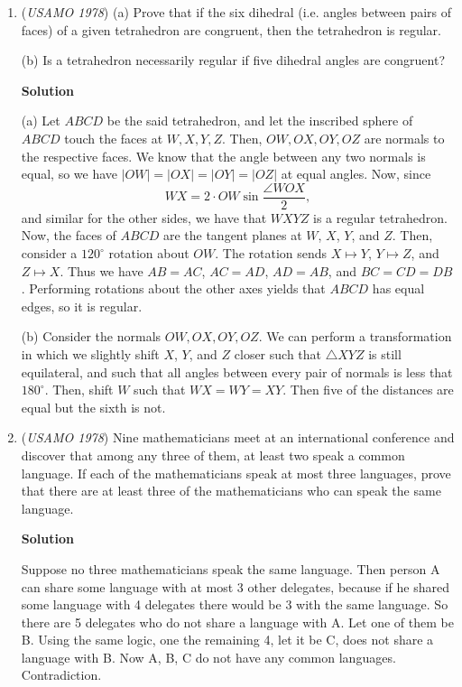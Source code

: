 \begin{enumerate}
 This completes the inductive step and thus the induction. Therefore, all integers $n \ge 33$ are good integers.

 


	\item (\textit{USAMO 1978}) (a) Prove that if the six dihedral (i.e. angles between pairs of faces) of a given tetrahedron are congruent, then the tetrahedron is regular.


 (b) Is a tetrahedron necessarily regular if five dihedral angles are congruent?


 



\textbf{Solution}

(a) Let $ABCD$ be the said tetrahedron, and let the inscribed sphere of $ABCD$ touch the faces at $W, X, Y, Z$. Then, $OW, OX, OY, OZ$ are normals to the respective faces. We know that the angle between any two normals is equal, so we have $|OW|=|OX|=|OY|=|OZ|$ at equal angles. Now, since 
 \[WX=2\cdot OW\sin\frac{\angle{WOX}}{2},\] and similar for the other sides, we have that $WXYZ$ is a regular tetrahedron. Now, the faces of $ABCD$ are the tangent planes at $W$, $X$, $Y$, and $Z$. Then, consider a $120^{\circ}$ rotation about $OW$. The rotation sends $X\mapsto Y$, $Y\mapsto Z$, and $Z\mapsto X$. Thus we have $AB=AC$, $AC=AD$, $AD=AB$, and $BC=CD=DB$. Performing rotations about the other axes yields that $ABCD$ has equal edges, so it is regular.

 (b) Consider the normals $OW, OX, OY, OZ$. We can perform a transformation in which we slightly shift $X$, $Y$, and $Z$ closer such that $\triangle XYZ$ is still equilateral, and such that all angles between every pair of normals is less that $180^{\circ}$. Then, shift $W$ such that $WX=WY=XY$. Then five of the distances are equal but the sixth is not.

 


	\item (\textit{USAMO 1978}) Nine mathematicians meet at an international conference and discover that among any three of them, at least two speak a common language. If each of the mathematicians speak at most three languages, prove that there are at least three of the mathematicians who can speak the same language.


 



\textbf{Solution}

Suppose no three mathematicians speak the same language. Then person A can share some language with at most 3 other delegates, because if he shared some language with 4 delegates there would be 3 with the same language. So there are 5 delegates who do not share a language with A. Let one of them be B. Using the same logic, one the remaining 4, let it be C, does not share a language with B. Now A, B, C do not have any common languages. Contradiction.

 


\end{enumerate}